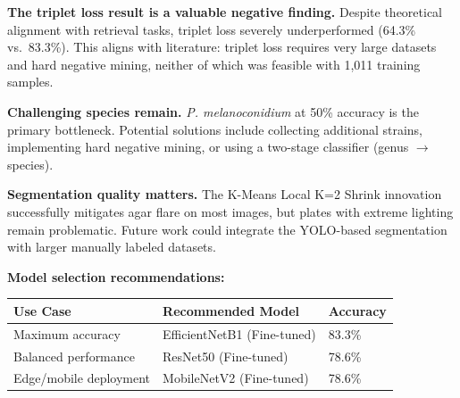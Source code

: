 \textbf{The triplet loss result is a valuable negative finding.} Despite theoretical alignment with retrieval tasks, triplet loss severely underperformed (64.3\% vs.~83.3\%). This aligns with literature: triplet loss requires very large datasets and hard negative mining, neither of which was feasible with 1,011 training samples.

\textbf{Challenging species remain.} \textit{P. melanoconidium} at 50\% accuracy is the primary bottleneck. Potential solutions include collecting additional strains, implementing hard negative mining, or using a two-stage classifier (genus \(\to\) species).

\textbf{Segmentation quality matters.} The K-Means Local K=2 Shrink innovation successfully mitigates agar flare on most images, but plates with extreme lighting remain problematic. Future work could integrate the YOLO-based segmentation with larger manually labeled datasets.

\textbf{Model selection recommendations:}

\begin{table}[h]
\centering
\begin{tabular}{@{}lll@{}}
\toprule
\textbf{Use Case} & \textbf{Recommended Model} & \textbf{Accuracy} \\
\midrule
Maximum accuracy & EfficientNetB1 (Fine-tuned) & 83.3\% \\
Balanced performance & ResNet50 (Fine-tuned) & 78.6\% \\
Edge/mobile deployment & MobileNetV2 (Fine-tuned) & 78.6\% \\
\bottomrule
\end{tabular}
\end{table}
